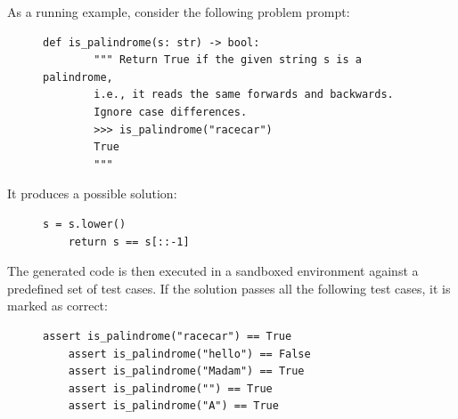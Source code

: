\documentclass[mscthesis]{usiinfthesis}
\begin{document}
As a running example, consider the following problem prompt:
\begin{figure}[H]
	\centering
	\begin{tcolorbox}[
		colback=gray!6,
		colframe=gray!50,
		arc=3pt,
		boxrule=0.5pt,
		title={\small\textbf{Problem Prompt}},
		fonttitle=\bfseries,
		left=6pt, right=6pt, top=4pt, bottom=4pt
	]
\begin{lstlisting}[style=pythonstyle]
	def is_palindrome(s: str) -> bool:
		""" Return True if the given string s is a palindrome,
		i.e., it reads the same forwards and backwards.
		Ignore case differences.
		>>> is_palindrome("racecar")
		True
		"""
\end{lstlisting}
	\end{tcolorbox}
\end{figure}

It produces a possible solution:
\begin{figure}[H]
	\centering
	\begin{tcolorbox}[
		colback=gray!6,
		colframe=gray!50,
		arc=3pt,
		boxrule=0.5pt,
		title={\small\textbf{Generated Code}},
		fonttitle=\bfseries,
		left=6pt, right=6pt, top=4pt, bottom=4pt
	]
\begin{lstlisting}[style=pythonstyle]
	s = s.lower()
	return s == s[::-1]
\end{lstlisting}
\end{tcolorbox}
\end{figure}

The generated code is then executed in a sandboxed environment against a predefined set of test cases. If the solution passes all the following test cases, it is marked as correct:
\begin{figure}[H]
	\centering
	\begin{tcolorbox}[
		colback=gray!6,
		colframe=gray!50,
		arc=3pt,
		boxrule=0.5pt,
		title={\small\textbf{Test Cases}},
		fonttitle=\bfseries,
		left=6pt, right=6pt, top=4pt, bottom=4pt
	]
\begin{lstlisting}[style=pythonstyle]
	assert is_palindrome("racecar") == True
	assert is_palindrome("hello") == False
	assert is_palindrome("Madam") == True
	assert is_palindrome("") == True
	assert is_palindrome("A") == True
\end{lstlisting}
\end{tcolorbox}
\end{figure}
\end{document}
